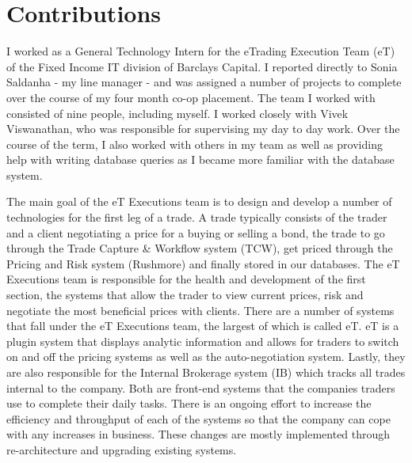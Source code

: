 \section*{Contributions} %
\label{sec:contributions}

I worked as a General Technology Intern for the eTrading Execution Team (eT) of the Fixed Income IT division of Barclays Capital.  I reported directly to Sonia Saldanha - my line manager - and was assigned a number of projects to complete over the course of my four month co-op placement.  The team I worked with consisted of nine people, including myself.  I worked closely with Vivek Viswanathan, who was responsible for supervising my day to day work.  Over the course of the term, I also worked with others in my team as well as providing help with writing database queries as I became more familiar with the database system.\newline

The main goal of the eT Executions team is to design and develop a number of technologies for the first leg of a trade.  A trade typically consists of the trader and a client negotiating a price for a buying or selling a bond, the trade to go through the Trade Capture \& Workflow system (TCW), get priced through the Pricing and Risk system (Rushmore) and finally stored in our databases.  The eT Executions team is responsible for the health and development of the first section, the systems that allow the trader to view current prices, risk and negotiate the most beneficial prices with clients.  There are a number of systems that fall under the eT Executions team, the largest of which is called eT.  eT is a plugin system that displays analytic information and allows for traders to switch on and off the pricing systems as well as the auto-negotiation system. Lastly, they are also responsible for the Internal Brokerage system (IB) which tracks all trades internal to the company.  Both are front-end systems that the companies traders use to complete their daily tasks.  There is an ongoing effort to increase the efficiency and throughput of each of the systems so that the company can cope with any increases in business.  These changes are mostly implemented through re-architecture and upgrading existing systems.\newline

